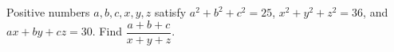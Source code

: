 Positive numbers $a,b,c,x,y,z$ satisfy $a^2+b^2+c^2=25$, $x^2+y^2+z^2=36$, and $ax+by+cz=30$. Find $\dfrac{a+b+c}{x+y+z}$.
